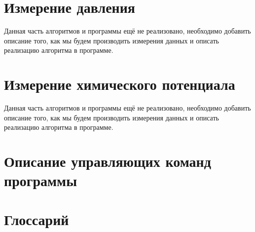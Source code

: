 \documentclass{article}
\begin{document}
\newpage
\section{Измерение давления}
Данная часть алгоритмов и программы ещё не реализовано, необходимо добавить описание того, как мы будем производить измерения данных и описать реализацию алгоритма в программе.

\newpage
\section{Измерение химического потенциала}
Данная часть алгоритмов и программы ещё не реализовано, необходимо добавить описание того, как мы будем производить измерения данных и описать реализацию алгоритма в программе.


\newpage
\section{Описание управляющих команд программы}

\newpage
\section{Глоссарий}
\end{document}
